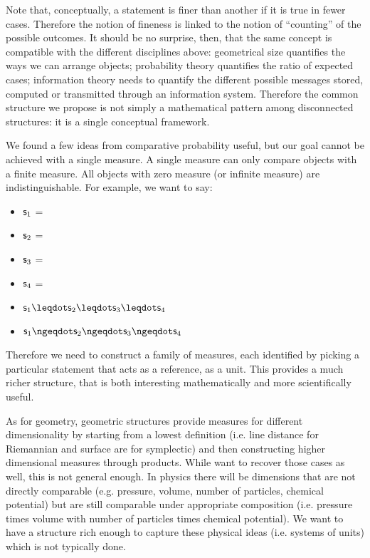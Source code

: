 \documentclass[11pt]{article}
\begin{document}
Note that, conceptually, a statement is finer than another if it is true in fewer cases. Therefore the notion of fineness is linked to the notion of ``counting'' of the possible outcomes. It should be no surprise, then, that the same concept is compatible with the different disciplines above: geometrical size quantifies the ways we can arrange objects; probability theory quantifies the ratio of expected cases; information theory needs to quantify the different possible messages stored, computed or transmitted through an information system. Therefore the common structure we propose is not simply a mathematical pattern among disconnected structures: it is a single conceptual framework.

We found a few ideas from comparative probability useful, but our goal cannot be achieved with a single measure. A single measure can only compare objects with a finite measure. All objects with zero measure (or infinite measure) are indistinguishable. For example, we want to say:
\begin{itemize}
    \item $\mathsf{s}_1$ = 
    \item $\mathsf{s}_2$ = 
    \item $\mathsf{s}_3$ = 
    \item $\mathsf{s}_4$ = 
    \item $\stmt_1 \finer \stmt_2 \finer \stmt_3 \finer \stmt_4$
    \item $\stmt_1 \ncoarser \stmt_2 \ncoarser \stmt_3 \ncoarser \stmt_4$
\end{itemize}
Therefore we need to construct a family of measures, each identified by picking a particular statement that acts as a reference, as a unit. This provides a much richer structure, that is both interesting mathematically and more scientifically useful.

As for geometry, geometric structures provide measures for different dimensionality by starting from a lowest definition (i.e. line distance for Riemannian and surface are for symplectic) and then constructing higher dimensional measures through products. While want to recover those cases as well, this is not general enough. In physics there will be dimensions that are not directly comparable (e.g. pressure, volume, number of particles, chemical potential) but are still comparable under appropriate composition (i.e. pressure times volume with number of particles times chemical potential). We want to have a structure rich enough to capture these physical ideas (i.e. systems of units) which is not typically done.
\end{document}

